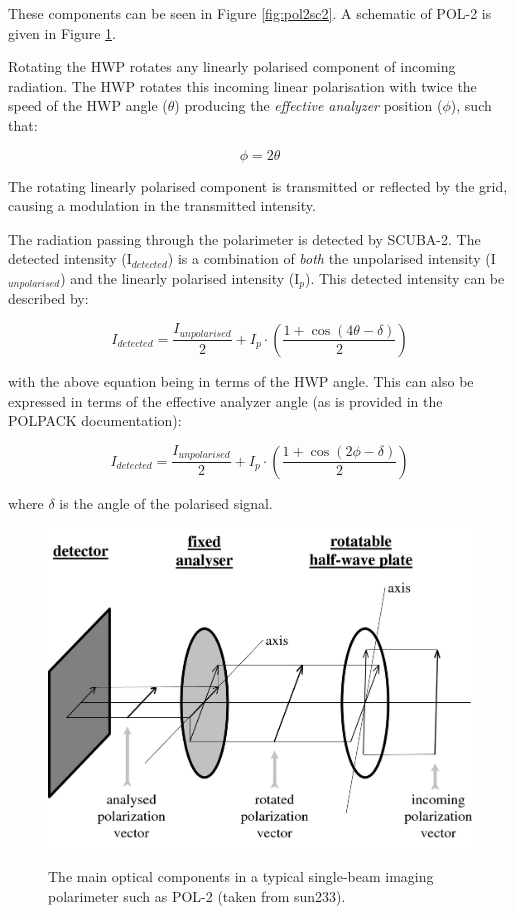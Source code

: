 These components can be seen in Figure \ref{fig:pol2sc2}.  A schematic
of POL-2 is given in Figure \ref{fig:pol2sc2diagram}.


Rotating the HWP rotates any linearly polarised component of incoming
radiation. The HWP rotates this incoming linear polarisation with
twice the speed of the HWP angle ($\theta$) producing the
\emph{effective analyzer} position ($\phi$), such that:


\begin{equation}
\phi = 2 \theta
\end{equation}


The rotating linearly polarised component is transmitted or reflected
by the grid, causing a modulation in the transmitted intensity.

The radiation passing through the polarimeter is detected by
SCUBA-2. The detected intensity (I$_{detected}$) is a combination of
\emph{both} the unpolarised intensity (I$_{unpolarised}$) and the
linearly polarised intensity (I$_{p}$). This detected intensity can be
described by:


\begin{equation}
I_{detected} = \frac{I_{unpolarised}}{2}+ I_{p}\cdot\left(\frac{1+\cos(4\theta - \delta)}{2} \right)
\end{equation}

with the above equation being in terms of the HWP angle. This can also
be expressed in terms of the effective analyzer angle (as is provided
in the POLPACK documentation):


\begin{equation}
I_{detected} = \frac{I_{unpolarised}}{2}+ I_{p}\cdot\left(\frac{1+\cos(2\phi - \delta)}{2} \right)
\end{equation}

where $\delta$ is the angle of the polarised signal.


\begin{figure}[t!]
\begin{center}
\includegraphics[width=0.8\linewidth]{singopt.png}
\label{fig:pol2sc2diagram}
\caption [POL-2 optical components]{ The main optical components in a
  typical single-beam imaging polarimeter such as POL-2 (taken from
  sun233).}
\end{center}
\end{figure}

